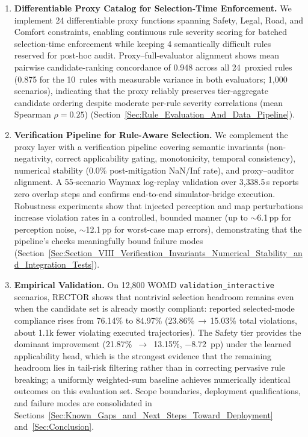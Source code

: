\begin{enumerate}[label=\textbf{C\arabic*},leftmargin=2.5em]
\item \textbf{Differentiable Proxy Catalog for Selection-Time Enforcement.} We implement 24 differentiable proxy functions spanning Safety, Legal, Road, and Comfort constraints, enabling continuous rule severity scoring for batched selection-time enforcement while keeping 4 semantically difficult rules reserved for post-hoc audit.  Proxy--full-evaluator alignment shows mean pairwise candidate-ranking concordance of 0.948 across all 24~proxied rules (0.875 for the 10~rules with measurable variance in both evaluators; 1{,}000 scenarios), indicating that the proxy reliably preserves tier-aggregate candidate ordering despite moderate per-rule severity correlations (mean Spearman $\rho{=}0.25$) (Section~\ref{Sec:Rule_Evaluation_And_Data_Pipeline}).

\item \textbf{Verification Pipeline for Rule-Aware Selection.} We complement the proxy layer with a verification pipeline covering semantic invariants (non-negativity, correct applicability gating, monotonicity, temporal consistency), numerical stability (0.0\% post-mitigation NaN/Inf rate), and proxy--auditor alignment.  A 55-scenario Waymax log-replay validation over 3{,}338.5\,s reports zero overlap steps and confirms end-to-end simulator-bridge execution.  Robustness experiments show that injected perception and map perturbations increase violation rates in a controlled, bounded manner (up to ${\sim}$6.1\,pp for perception noise, ${\sim}$12.1\,pp for worst-case map errors), demonstrating that the pipeline's checks meaningfully bound failure modes (Section~\ref{Sec:Section_VIII_Verification_Invariants_Numerical_Stability_and_Integration_Tests}).

\item \textbf{Empirical Validation.} On 12{,}800 WOMD \texttt{validation\_interactive} scenarios, \textsc{RECTOR} shows that nontrivial selection headroom remains even when the candidate set is already mostly compliant: reported selected-mode compliance rises from 76.14\% to 84.97\% (23.86\%\,$\to$\,15.03\% total violations, about 1.1k fewer violating executed trajectories).  The Safety tier provides the dominant improvement (21.87\%~$\to$~13.15\%, $-$8.72~pp) under the learned applicability head, which is the strongest evidence that the remaining headroom lies in tail-risk filtering rather than in correcting pervasive rule breaking; a uniformly weighted-sum baseline achieves numerically identical outcomes on this evaluation set.  Scope boundaries, deployment qualifications, and failure modes are consolidated in Sections~\ref{Sec:Known_Gaps_and_Next_Steps_Toward_Deployment} and~\ref{Sec:Conclusion}.

\end{enumerate}

